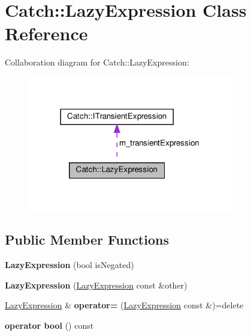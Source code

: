 \hypertarget{classCatch_1_1LazyExpression}{}\section{Catch\+:\+:Lazy\+Expression Class Reference}
\label{classCatch_1_1LazyExpression}


Collaboration diagram for Catch\+:\+:Lazy\+Expression\+:
\nopagebreak
\begin{figure}[H]
\begin{center}
\leavevmode
\includegraphics[width=254pt]{classCatch_1_1LazyExpression__coll__graph}
\end{center}
\end{figure}
\subsection*{Public Member Functions}
\begin{DoxyCompactItemize}
\item 
\mbox{\label{classCatch_1_1LazyExpression_a47186c2487bd4bf871e870ba8048553a}} 
{\bfseries Lazy\+Expression} (bool is\+Negated)
\item 
\mbox{\label{classCatch_1_1LazyExpression_ab82d5e94df0e159b018fbde0170e46f8}} 
{\bfseries Lazy\+Expression} (\hyperlink{classCatch_1_1LazyExpression}{Lazy\+Expression} const \&other)
\item 
\mbox{\label{classCatch_1_1LazyExpression_ae4ae00d4f36f084c369f2da36565a822}} 
\hyperlink{classCatch_1_1LazyExpression}{Lazy\+Expression} \& {\bfseries operator=} (\hyperlink{classCatch_1_1LazyExpression}{Lazy\+Expression} const \&)=delete
\item 
\mbox{\label{classCatch_1_1LazyExpression_acdb846cb230cecfc6aca7a925b31fbca}} 
{\bfseries operator bool} () const
\end{DoxyCompactItemize}
